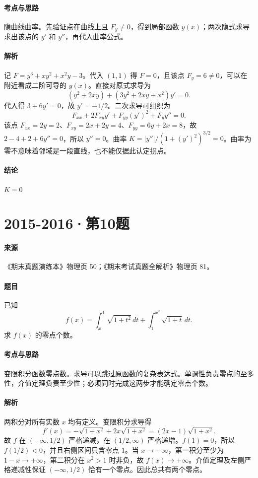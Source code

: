 \documentclass[UTF8,fontset=fandol,12pt,oneside,openany]{ctexrep}
\theoremstyle{definition}
\begin{document}
\paragraph{考点与思路}
隐曲线曲率。先验证点在曲线上且 $F_y\ne0$，得到局部函数 $y(x)$；两次隐式求导求出该点的 $y'$ 和 $y''$，再代入曲率公式。
\paragraph{解析}
记 $F=y^3+xy^2+x^2y-3$。代入 $(1,1)$ 得 $F=0$，且该点 $F_y=6\ne0$，可以在附近看成二阶可导的 $y(x)$。直接对原式求导为
\[(y^2+2xy)+(3y^2+2xy+x^2)y'=0.\]
代入得 $3+6y'=0$，故 $y'=-1/2$。二次求导可组织为
\[F_{xx}+2F_{xy}y'+F_{yy}(y')^2+F_y y''=0.\]
该点 $F_{xx}=2y=2$、$F_{xy}=2x+2y=4$、$F_{yy}=6y+2x=8$，故 $2-4+2+6y''=0$，所以 $y''=0$。曲率 $K=\lvert y''\rvert/(1+(y')^2)^{3/2}=0$。曲率为零不意味着邻域是一段直线，也不能仅据此认定拐点。
\paragraph{结论}
$K=0$

\par\addvspace{18pt}\noindent\begin{minipage}{\linewidth}
\section{2015-2016·第10题}
\paragraph{来源}《期末真题演练本》物理页 50；《期末考试真题全解析》物理页 81。
\paragraph{题目}
已知
\[f(x)=\int_x^1\sqrt{1+t^2}\,dt+\int_1^{x^2}\sqrt{1+t}\,dt.\]
求 $f(x)$ 的零点个数。
\end{minipage}\par
\paragraph{考点与思路}
变限积分函数零点数。求导可以跳过原函数的复杂表达式。单调性负责零点的至多性，介值定理负责至少性；必须同时完成这两步才能确定零点个数。
\paragraph{解析}
两积分对所有实数 $x$ 均有定义。变限积分求导得
\[f'(x)=-\sqrt{1+x^2}+2x\sqrt{1+x^2}=(2x-1)\sqrt{1+x^2}.\]
故 $f$ 在 $(-\infty,1/2)$ 严格递减，在 $(1/2,\infty)$ 严格递增。$f(1)=0$，所以 $f(1/2)<0$，并且右侧区间只含零点 $1$。当 $x\to-\infty$，第一积分至少为 $1-x\to+\infty$，第二积分在 $x^2>1$ 时非负，故 $f(x)\to+\infty$。介值定理及左侧严格递减性保证 $(-\infty,1/2)$ 恰有一个零点。因此总共有两个零点。
\end{document}
